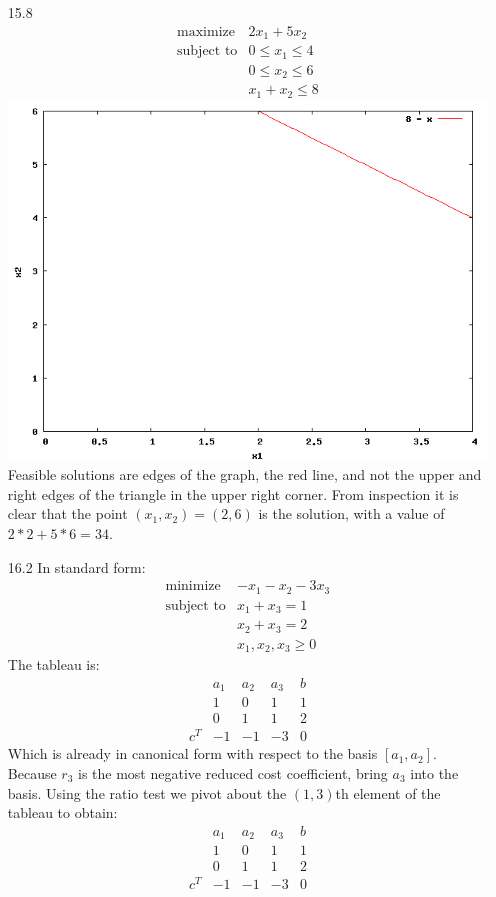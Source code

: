 \documentclass{article}
\begin{document}
\begin{itemize}
	\item[15.8]
		\begin{displaymath}
			\begin{array}{rl}
				\textrm{maximize} & 2x_1 + 5x_2 \\
				\textrm{subject to} & 0 \le x_1 \le 4 \\
				& 0 \le x_2 \le 6 \\
				& x_1 + x_2 \le 8
			\end{array}
		\end{displaymath}
		\includegraphics[width=0.5\linewidth]{15-8} \\
		Feasible solutions are edges of the graph, the red line, and not the upper and right edges of the triangle in the upper right corner. From inspection it is clear that the point $(x_1, x_2) = (2, 6)$ is the solution, with a value of $2*2 + 5*6 = 34$.
	\item[16.2] In standard form:
		\begin{displaymath}
			\begin{array}{rl}
				\textrm{minimize} & -x_1 - x_2 - 3x_3 \\
				\textrm{subject to} & x_1 + x_3 = 1 \\
				& x_2 + x_3 = 2 \\
				& x_1, x_2, x_3 \ge 0
			\end{array}
		\end{displaymath}
		The tableau is:
		\begin{displaymath}
			\begin{array}{ccccc}
				& a_1 & a_2 & a_3  & b \\
				& 1 & 0 & 1 & 1 \\
				& 0 & 1 & 1 & 2 \\
				c^T & -1 & -1 & -3 & 0
			\end{array}
		\end{displaymath}
		Which is already in canonical form with respect to the basis $[a_1, a_2]$. Because $r_3$ is the most negative reduced cost coefficient, bring $a_3$ into the basis. Using the ratio test we pivot about the $(1, 3)$th element of the tableau to obtain:
		\begin{displaymath}
			\begin{array}{ccccc}
				& a_1 & a_2 & a_3  & b \\
				& 1 & 0 & 1 & 1 \\
				& 0 & 1 & 1 & 2 \\
				c^T & -1 & -1 & -3 & 0
			\end{array}
		\end{displaymath}
		

\end{itemize}
\end{document}
